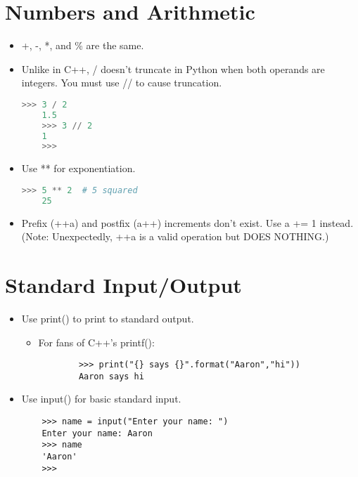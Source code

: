 \documentclass{article}
\begin{document}
\section{Numbers and Arithmetic}
\label{sec:numbers-and-arithmetic}
\begin{itemize}
    \item +, -, *, and \% are the same.
    \item Unlike in C++, / doesn't truncate in Python when both operands are integers. You must use // to cause truncation.
    \begin{lstlisting}[language=Python]
    >>> 3 / 2
    1.5
    >>> 3 // 2
    1
    >>> 
    \end{lstlisting}
    \item Use ** for exponentiation.
    \begin{lstlisting}[language=Python]
    >>> 5 ** 2  # 5 squared
    25
    \end{lstlisting}
    \item Prefix (++a) and postfix (a++) increments don't exist. Use a += 1 instead. (Note: Unexpectedly, ++a is a valid operation but DOES NOTHING.) 

\end{itemize}

\section{Standard Input/Output}
\begin{itemize}
    \item Use print() to print to standard output.
        \begin{itemize}
        \item For fans of C++'s printf():
        \begin{lstlisting}
        >>> print("{} says {}".format("Aaron","hi"))
        Aaron says hi
        \end{lstlisting}
        \end{itemize}
    \item Use input() for basic standard input.
    \begin{lstlisting}
    >>> name = input("Enter your name: ")
    Enter your name: Aaron
    >>> name
    'Aaron'
    >>> 
    \end{lstlisting}
\end{itemize}
\end{document}
